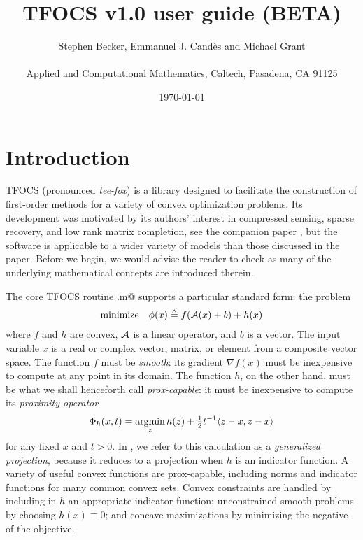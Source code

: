 \documentclass{article}
\title{TFOCS v1.0 user guide (BETA)}
\author{Stephen Becker, Emmanuel J. Cand\`es and Michael Grant \\
  \vspace{-.1cm}\\
  Applied and Computational Mathematics,
  Caltech, Pasadena, CA 91125}
\date{\today}
\begin{document}
\maketitle

\tableofcontents

\section{Introduction}

TFOCS (pronounced \emph{tee-fox}) is a library designed to facilitate
the construction of first-order methods for a variety of convex
optimization problems. Its development was motivated by its authors'
interest in compressed sensing, sparse recovery, and low rank matrix
completion, see the companion paper \cite{TFOCS}, but the software is
applicable to a wider variety of models than those discussed in the
paper. Before we begin, we would advise the reader to check
\cite{TFOCS} as many of the underlying mathematical concepts are
introduced therein.

The core TFOCS routine \verb@tfocs.m@ supports a particular standard
form: the problem
\begin{equation} 
	\label{eq:stdform}
	\begin{array}{ll}
	\operatorname*{minimize} & \phi(x) \triangleq f(\mathcal{A}(x)+b) + h(x)
	\end{array}
\end{equation}
where $f$ and $h$ are convex, $\mathcal{A}$ is a linear operator,
and $b$ is a vector. 
The input variable $x$ is a real or complex vector, matrix, or element
from a composite vector space.
The function $f$ must be \emph{smooth}:
its gradient $\nabla f(x)$ must be inexpensive to compute at any
point in its domain. The function $h$,
on the other hand, must be what we shall
henceforth call \emph{prox-capable}: it must
be inexpensive to compute its \emph{proximity operator}
\begin{equation}
	\label{eq:proxmin}
	\Phi_h(x,t) = \operatorname*{argmin}_z h(z) + {\textstyle\frac{1}{2}} t^{-1} \langle z-x,z-x\rangle
\end{equation}
for any fixed $x$ and $t>0$. 
In \cite{TFOCS}, we refer to this calculation as a \emph{generalized
projection}, because it reduces to a projection when $h$ is an indicator
function. A variety of useful convex functions are
prox-capable, including norms and indicator functions for many
common convex sets.
Convex constraints are handled by including in $h$ an appropriate
indicator function; unconstrained smooth problems
by choosing $h(x)\equiv 0$; and concave maximizations by
minimizing the negative of the objective.
\end{document}
